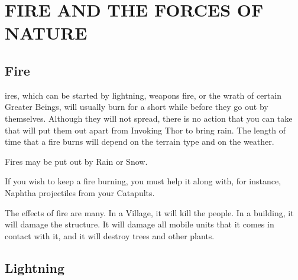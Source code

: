 
\chapter{\textsf{FIRE AND THE FORCES OF NATURE}}

\section{\textsf{Fire}}


ires, which can be started by lightning, weapons fire, or the wrath of certain Greater Beings, will usually burn for a short while before they go out by themselves. Although they will not spread, there is no action that you can take that will put them out apart from Invoking Thor to bring rain. The length of time that a fire burns will depend on the terrain type and on the weather.

Fires may be put out by Rain or Snow.

If you wish to keep a fire burning, you must help it along with, for instance, Naphtha projectiles from your Catapults.

The effects of fire are many. In a Village, it will kill the people. In a building, it will damage the structure. It will damage all mobile units that it comes in contact with it, and it will destroy trees and other plants.

\section{\textsf{Lightning}}



